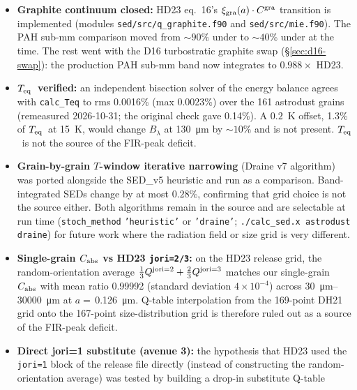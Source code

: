 \documentclass{my_memo}
\newcommand{\Teq}{\ensuremath{T_{\rm eq}}}
\begin{document}
\begin{itemize}
  \item \textbf{Graphite continuum closed:} HD23 eq.~16's
        $\xi_{\rm gra}(a) \cdot C^{\rm gra}$ transition is implemented
        (modules \texttt{sed/src/q\_graphite.f90} and
        \texttt{sed/src/mie.f90}). The PAH sub-mm comparison moved from
        $\sim 90\%$ under to $\sim 40\%$ under at the time. The rest
        went with the D16 turbostratic graphite swap
        (\S\ref{sec:d16-swap}): the production PAH sub-mm band now
        integrates to $0.988\times$ HD23.
  \item \textbf{\Teq\ verified:} an independent bisection solver of the
        energy balance agrees with \texttt{calc\_Teq} to rms 0.0016\%
        (max 0.0023\%) over the 161 astrodust grains (remeasured
        2026-10-31; the original check gave 0.14\%). A $0.2$~K offset,
        1.3\% of \Teq\ at 15~K, would change $B_\lambda$ at
        \SI{130}{\micro\meter} by $\sim 10\%$ and is not present. \Teq\
        is not the source of the FIR-peak deficit.
  \item \textbf{Grain-by-grain $T$-window iterative narrowing} (Draine
        v7 algorithm) was ported alongside the SED\_v5 heuristic and run
        as a comparison. Band-integrated SEDs change by at most
        $0.28\%$, confirming that grid choice is not the source either.
        Both algorithms remain in the source and are selectable at run
        time (\texttt{stoch\_method} \texttt{'heuristic'} or
        \texttt{'draine'}; \texttt{./calc\_sed.x astrodust draine}) for
        future work where the radiation field or size grid is very
        different.
  \item \textbf{Single-grain $C_{\rm abs}$ vs HD23 \texttt{jori=2/3}:} on
        the HD23 release grid, the random-orientation average
        $\tfrac{1}{3}Q^{\rm jori=2}+\tfrac{2}{3}Q^{\rm jori=3}$
        matches our single-grain $C_{\rm abs}$ with mean ratio 0.99992
        (standard deviation $4\times10^{-4}$) across
        \SI{30}{\micro\meter}--\SI{30000}{\micro\meter} at
        $a = $\,\SI{0.126}{\micro\meter}. Q-table interpolation from
        the 169-point DH21 grid onto the 167-point size-distribution
        grid is therefore ruled out as a source of the FIR-peak
        deficit.
  \item \textbf{Direct jori=1 substitute (avenue 3):} the hypothesis
        that HD23 used the \texttt{jori=1} block of the release file
        directly (instead of constructing the random-orientation
        average) was tested by building a drop-in substitute Q-table

\end{itemize}
\end{document}
